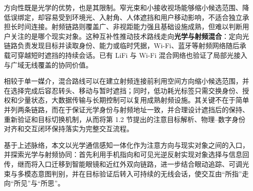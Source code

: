 方向性既是光学的优势，也是其限制。窄光束和小接收视场能够缩小候选范围、降低误绑定，却容易受到环境光、入射角、人体遮挡和用户移动影响，不适合独立承担长时间连接。射频链路则覆盖广、非视距能力强且基础设施成熟，但难以判断用户关注的是哪个现实对象。这种互补性推动技术路线走向\textbf{光学与射频混合}：定向光链路负责发现目标并读取身份、能力或临时凭据，Wi-Fi、蓝牙等射频网络随后承载可穿越短时遮挡的持续会话。已有 LiFi 与 Wi-Fi 混合网络也验证了局部光接入与广域无线覆盖的协同价值\supercite{hybrid_lifi_wifi}。

相较于单一媒介，混合路线可以在建立射频连接前利用空间方向缩小候选范围，并在选择完成后容忍转头、移动与暂时遮挡；同时，低功耗光标签只需交换身份、授权和少量状态，大数据传输与长期控制可以复用成熟射频设施。其关键不在于简单并列两条链路，而在于保证光学身份与射频地址一致，并合理设计遮挡后的保持、重新验证和目标切换机制，从而将第 1.2 节提出的注意目标解析、物理--数字身份对齐和交互闭环保持落实为完整交互流程。

基于上述脉络，本文以光学通信感知一体化作为注意方向与现实对象之间的入口，并探索光学与射频协同：首先利用手机指向和可见光逆反射实现对象选择与信息回传，继而将入口迁移到智能眼镜和近红外双向链路，进一步结合眼动追踪、可调光束与多模态意图判别，并在目标验证后转入可持续的无线会话，使交互由“所指”走向“所见”与“所思”。
